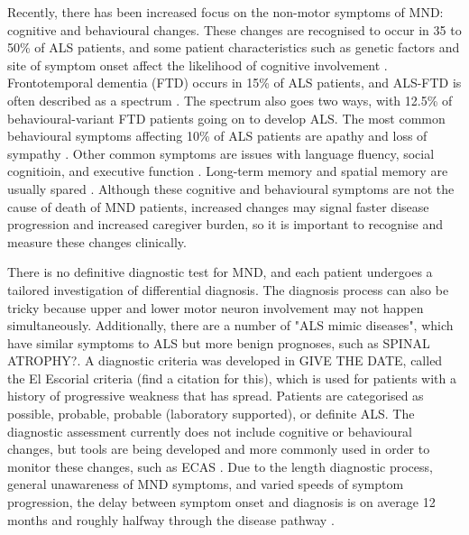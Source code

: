 Recently, there has been increased focus on the non-motor symptoms of MND: cognitive and behavioural changes. These changes are recognised to occur in 35 to 50\% of ALS patients, and some patient characteristics such as genetic factors and site of symptom onset affect the likelihood of cognitive involvement \cite{yangRiskFactorsCognitive2021, chioALSPhenotypeInfluenced2020}. Frontotemporal dementia (FTD) occurs in 15\% of ALS patients, and ALS-FTD is often described as a spectrum \cite{strongAmyotrophicLateralSclerosis2017}. The spectrum also goes two ways, with 12.5\% of behavioural-variant FTD patients going on to develop ALS.
The most common behavioural symptoms affecting 10\% of ALS patients are apathy and loss of sympathy \cite{abrahamsScreeningCognitionBehaviour2014}. Other common symptoms are issues with language fluency, social cognitioin, and executive function \cite{beeldmanCognitiveProfileALS2016}. Long-term memory and spatial memory are usually spared \cite{crockfordALSspecificCognitiveBehavior2018}. Although these cognitive and behavioural symptoms are not the cause of death of MND patients, increased changes may signal faster disease progression and increased caregiver burden, so it is important to recognise and measure these changes clinically.

There is no definitive diagnostic test for MND, and each patient undergoes a tailored investigation of differential diagnosis. The diagnosis process can also be tricky because upper and lower motor neuron involvement may not happen simultaneously. Additionally, there are a number of "ALS mimic diseases", which have similar symptoms to ALS but more benign prognoses, such as SPINAL ATROPHY?. A diagnostic criteria was developed in GIVE THE DATE, called the El Escorial criteria (find a citation for this), which is used for patients with a history of progressive weakness that has spread. Patients are categorised as possible, probable, probable (laboratory supported), or definite ALS.
The diagnostic assessment currently does not include cognitive or behavioural changes, but tools are being developed and more commonly used in order to monitor these changes, such as ECAS \cite{abrahamsScreeningCognitionBehaviour2014}.
Due to the length diagnostic process, general unawareness of MND symptoms, and varied speeds of symptom progression, the delay between symptom onset and diagnosis is on average 12 months and roughly halfway through the disease pathway \cite{mitchellTimelinesDiagnosticEvaluation2010}.

